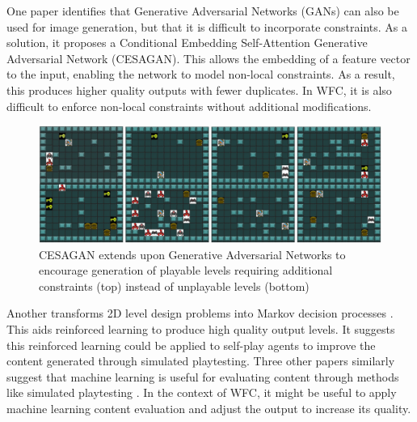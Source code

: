 One paper \cite{CESAGAN} identifies that Generative Adversarial Networks (GANs) can also be used for image generation, but that it is difficult to incorporate constraints. As a solution, it proposes a Conditional Embedding Self-Attention Generative Adversarial Network (CESAGAN). This allows the embedding of a feature vector to the input, enabling the network to model non-local constraints. As a result, this produces higher quality outputs with fewer duplicates. In WFC, it is also difficult to enforce non-local constraints without additional modifications.

\begin{figure}[H]
    \centering
    \includegraphics[width=\textwidth, height=0.3\textheight, keepaspectratio]{Images/CESAGAN.jpg}
    \caption{CESAGAN extends upon Generative Adversarial Networks to encourage generation of playable levels requiring additional constraints (top) instead of unplayable levels (bottom) \cite{CESAGAN}}
    \label{fig:cesagan}
\end{figure}

Another transforms 2D level design problems into Markov decision processes \cite{Markov_PCGRL}. This aids reinforced learning to produce high quality output levels. It suggests this reinforced learning could be applied to self-play agents to improve the content generated through simulated playtesting. Three other papers similarly suggest that machine learning is useful for evaluating content through methods like simulated playtesting \cite{DeepLearningPCG, VGDL_ASP, PCGML}. In the context of WFC, it might be useful to apply machine learning content evaluation and adjust the output to increase its quality.

